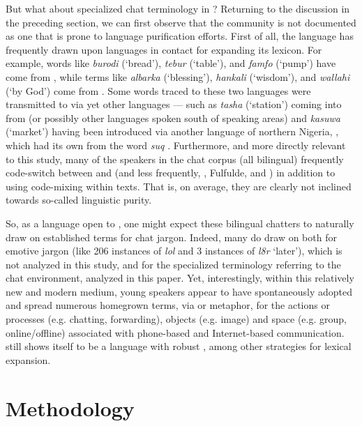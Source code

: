 \documentclass[output=paper,newtxmath,modfonts,nonflat,hidelinks]{langsci/langscibook}
\begin{document}
But what about specialized chat terminology in ? Returning to the discussion in the preceding section, we can first observe that the  community is not documented as one that is prone to language purification efforts. First of all, the  language has frequently drawn upon languages in contact for expanding its lexicon. For example, words like \textit{burodi} (‘bread’), \textit{tebur} (‘table’), and \textit{famfo} (‘pump’) have come from , while terms like \textit{albarka} (‘blessing’), \textit{hankali} (‘wisdom’), and \textit{wallahi} (‘by God’) come from . Some words traced to these two languages were transmitted to  via yet other languages — such as \textit{tasha} (‘station’) coming into  from  (or possibly other languages spoken south of  speaking areas) and \textit{kasuwa} (‘market’) having been introduced via another language of northern Nigeria, , which had its own  from the  word \textit{suq} \citep{newman2000comp}. Furthermore, and more directly relevant to this study, many of the  speakers in the  chat corpus (all bilingual) frequently code-switch between  and  (and less frequently, , Fulfulde, and ) in addition to using  code-mixing within  texts. That is, on average, they are clearly not inclined towards so-called linguistic purity.

So, as a language open to , one might expect these bilingual chatters to naturally draw on established  terms for chat jargon. Indeed, many do draw on  both for emotive jargon (like 206 instances of \textit{lol} and 3 instances of \textit{l8r} ‘later’), which is not analyzed in this study, and for the specialized terminology referring to the chat environment, analyzed in this paper. Yet, interestingly, within this relatively new and modern medium, young  speakers appear to have spontaneously adopted and spread numerous homegrown terms, via  or metaphor, for the actions or processes (e.g. chatting, forwarding), objects (e.g. image) and space (e.g. group, online/offline) associated with phone-based and Internet-based communication.  still shows itself to be a language with robust , among other strategies for lexical expansion.

\section{Methodology}\label{sec:purvis:3}
\end{document}
